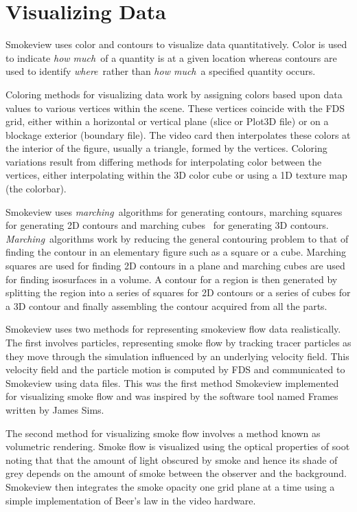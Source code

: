 \documentclass[11pt,twoside]{book}
\begin{document}
%
%

\chapter{Visualizing Data}
Smokeview uses color and contours to visualize data
quantitatively. Color is used to indicate {\em how much}\ of a
quantity is at a given location whereas contours are used to
identify {\em where}\ rather than {\em how much}\ a specified
quantity occurs.

Coloring methods for visualizing data work by assigning colors
based upon data values to various vertices within the scene. These
vertices coincide with the FDS grid, either within a horizontal or
vertical plane (slice or Plot3D file) or on a blockage exterior
(boundary file).  The video card then interpolates these colors at
the interior of the figure, usually a triangle, formed by the
vertices. Coloring variations result from differing methods for
interpolating color between the vertices, either interpolating
within the 3D color cube or using a 1D texture map (the colorbar).

Smokeview uses {\em marching}\ algorithms for generating contours,
marching squares for generating 2D contours and marching
cubes~\cite{marchingcubes} for generating 3D contours. {\em
Marching}\ algorithms work by reducing the general contouring
problem to that of finding the contour in an elementary figure
such as a square or a cube.  Marching squares are used for finding
2D contours in a plane and marching cubes are used for finding
isosurfaces in a volume. A contour for a region is then generated
by splitting the region into a series of squares for 2D contours
or a series of cubes for a 3D contour and finally assembling the
contour acquired from all the parts.

Smokeview uses two methods for representing smokeview flow data
realistically.  The first involves particles, representing smoke
flow by tracking tracer particles as they move through the
simulation influenced by an underlying  velocity field.  This
velocity field and the particle motion is computed by FDS and
communicated to Smokeview using data files.  This was the first
method Smokeview implemented for visualizing smoke flow and was
inspired by the software tool named Frames written by James Sims.

The second method for visualizing smoke flow involves a method
known as volumetric rendering.  Smoke flow is visualized using the
optical properties of soot noting that that the amount of light
obscured by smoke and hence its shade of grey depends on the
amount of smoke between the observer and the background. Smokeview
then integrates the smoke opacity one grid plane at a time using a
simple implementation of Beer's law in the video hardware.
\end{document}
